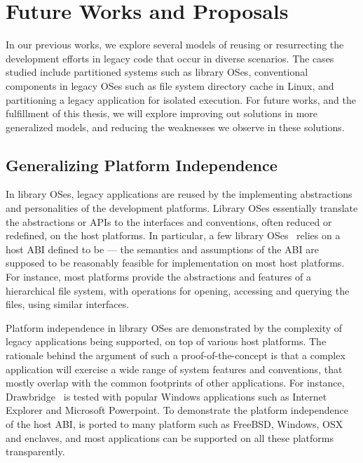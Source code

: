 \chapter{Future Works and Proposals}
\label{chap:future}

In our previous works, we explore several models of
reusing or resurrecting the development efforts in legacy code
that occur in diverse scenarios.
The cases studied include
partitioned systems such as library OSes,
conventional components in legacy OSes such as file system directory cache in Linux,
and partitioning a legacy \java{} application for isolated execution.
For future works, and the fulfillment of this thesis,
we will explore improving out solutions in more generalized models,
and reducing the weaknesses we observe in these solutions.



\section{Generalizing Platform Independence}

In library OSes, legacy applications are reused
by the \picoprocs{} implementing abstractions and personalities of the development platforms.
Library OSes essentially translate the abstractions or APIs
to the interfaces and conventions, often reduced or redefined, on the host platforms.
In particular, a few library OSes~\citep{porter11drawbridge, baumann13bascule, baumann14haven, tsai14graphene}
relies on a host ABI defined to be 
--- the semantics and assumptions of the ABI are supposed to be
reasonably feasible for implementation
on most host platforms.
For instance, most platforms provide the abstractions and features
of a hierarchical file system,
with operations for opening,
accessing and querying the files,
using similar interfaces.


Platform independence in library OSes are demonstrated by the complexity of legacy applications being supported,
on top of various host platforms.
The rationale behind the argument of such a proof-of-the-concept is that
a complex application will exercise a wide range of system features and conventions,
that mostly overlap with the common footprints of other applications.
For instance, Drawbridge~\cite{porter11drawbridge} is tested with
popular Windows applications such as Internet Explorer and Microsoft Powerpoint.
To demonstrate the platform independence of the host ABI,
\graphene{} is ported to many platform such as FreeBSD, Windows, OSX and \intel{} \sgx{} enclaves,
and most applications can be supported on all these platforms
transparently.

